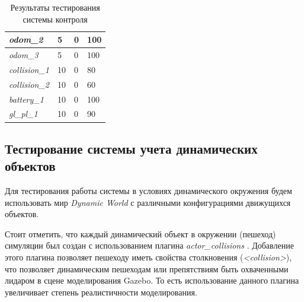 \begin{table}[]
\begin{tabular}{|l|l|ll|}
\textit{odom\_2}                                          & 5                                                                                                            & \multicolumn{1}{l|}{0}            & 100                               \\ \hline
\textit{odom\_3}                                          & 5                                                                                                            & \multicolumn{1}{l|}{0}            & 100                               \\ \hline
\textit{collision\_1}                                     & 10                                                                                                           & \multicolumn{1}{l|}{0}            & 80                                \\ \hline
\textit{collision\_2}                                     & 10                                                                                                           & \multicolumn{1}{l|}{0}            & 60                                \\ \hline
\textit{battery\_1}                                       & 10                                                                                                           & \multicolumn{1}{l|}{0}            & 100                               \\ \hline
\textit{gl\_pl\_1}                                        & 10                                                                                                           & \multicolumn{1}{l|}{0}            & 90                                \\ \hline
\end{tabular}
\caption{Результаты тестирования системы контроля}
\label{tab:results1}
\end{table}

\subsection{Тестирование системы учета динамических объектов}

Для тестирования работы системы в условиях динамического окружения будем использовать мир \textit{Dynamic World} с различными конфигурациями движущихся объектов. 

Стоит отметить, что каждый динамический объект в окружении (пешеход) симуляции был создан с использованием плагина \textit{actor\_collisions} \cite{actor-coll}. Добавление этого плагина позволяет пешеходу иметь свойства столкновения (\textit{<collision>}), что позволяет динамическим пешеходам или препятствиям быть охваченными лидаром в сцене моделирования Gazebo. То есть использование данного плагина увеличивает степень реалистичности моделирования.

